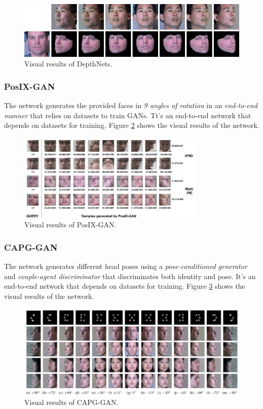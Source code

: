 \begin{figure}[H]
    \centering
    \includegraphics[width=\textwidth]{images/depthnets.png}
    \caption{Visual results of DepthNets.}
    \label{fig:dn}
\end{figure}

\subsubsection{PosIX-GAN}

The network \cite{inbook} generates the provided faces in \emph{9 angles of rotation} in an \emph{end-to-end manner} that relies on datasets to train GANs. Tt's an end-to-end network that depends on datasets for training. Figure \ref{fig:posix} shows the visual results of the network.

\begin{figure}[H]
    \centering
    \includegraphics[width=0.8\textwidth]{images/posix-gan.png}
    \caption{Visual results of PosIX-GAN.}
    \label{fig:posix}
\end{figure}

\subsubsection{CAPG-GAN}
The network \cite{8578974} generates different head poses using a \emph{pose-conditioned generator} and \emph{couple-agent discriminator} that discriminates both identity and pose. It's an end-to-end network that depends on datasets for training. Figure \ref{fig:capg} shows the visual results of the network.

\begin{figure}[H]
    \centering
    \includegraphics[width=\textwidth]{images/capg-gan.png}
    \caption{Visual results of CAPG-GAN.}
    \label{fig:capg}
\end{figure}

